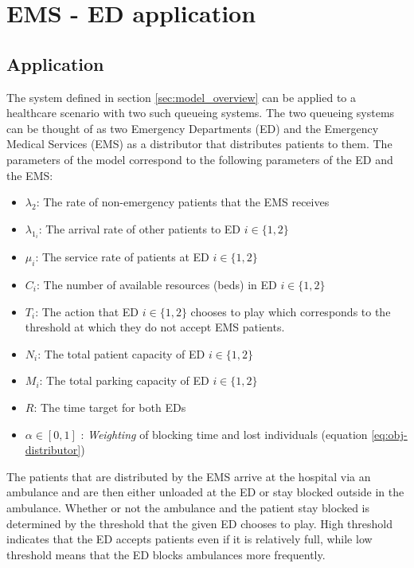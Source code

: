 \section{EMS - ED application}

\subsection{Application}

The system defined in section \ref{sec:model_overview} can be applied 
to a healthcare scenario with two such queueing systems.
The two queueing systems can be thought of as two Emergency Departments (ED) and 
the Emergency Medical Services (EMS) as a distributor that distributes 
patients to them.
The parameters of the model correspond to the following parameters of the ED and 
the EMS:

\begin{itemize}
    \item \( \lambda_2 \): The rate of non-emergency patients that the EMS 
    receives
    \item \( \lambda_{1_i} \): The arrival rate of other patients to ED \(i\in\{1, 2\}\)
    \item \( \mu_i \): The service rate of patients at ED \(i\in\{1, 2\}\)
    \item \( C_i \): The number of available resources (beds) in ED \(i\in\{1, 2\}\)  
    \item \( T_i \): The action that ED \(i\in\{1, 2\} \) chooses to play which 
    corresponds to the threshold at which they do not accept EMS patients.
    \item \( N_i \): The total patient capacity of ED \(i\in\{1, 2\} \)
    \item \( M_i \): The total parking capacity of ED \(i\in\{1, 2\} \)
    \item \( R \): The time target for both EDs
    \item \( \alpha \in [0, 1] \) : \textit{Weighting} of blocking time and 
    lost individuals (equation \ref{eq:obj-distributor})
\end{itemize}

The patients that are distributed by the EMS arrive at the hospital via an 
ambulance and are then either unloaded at the ED or stay blocked outside in 
the ambulance.
Whether or not the ambulance and the patient stay blocked is determined by 
the threshold that the given ED chooses to play.
High threshold indicates that the ED accepts patients even if it is relatively 
full, while low threshold means that the ED blocks ambulances more frequently.

